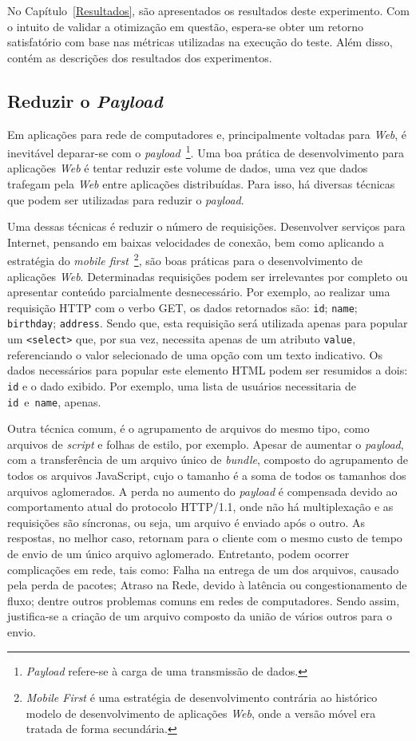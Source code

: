 No Capítulo~\ref{Resultados}, são apresentados os resultados deste experimento. Com o intuito de validar a otimização em questão, espera-se obter um retorno satisfatório com base nas métricas utilizadas na execução do teste. Além disso, contém as descrições dos resultados dos experimentos.
%
%
%
\subsection{Reduzir o \textit{Payload}}
\label{SubPayload}

Em aplicações para rede de computadores e, principalmente voltadas para \textit{Web}, é inevitável deparar-se com o \textit{payload}~\footnote{\textit{Payload} refere-se à carga de uma transmissão de dados.}. Uma boa prática de desenvolvimento para aplicações \textit{Web} é tentar reduzir este volume de dados, uma vez que dados trafegam pela \textit{Web} entre aplicações distribuídas. Para isso, há diversas técnicas que podem ser utilizadas para reduzir o \textit{payload}.

Uma dessas técnicas é reduzir o número de requisições. Desenvolver serviços para Internet, pensando em baixas velocidades de conexão, bem como aplicando a estratégia do \textit{mobile first}~\footnote{\textit{Mobile First} é uma estratégia de desenvolvimento contrária ao histórico modelo de desenvolvimento de aplicações \textit{Web}, onde a versão móvel era tratada de forma secundária.}, são boas práticas para o desenvolvimento de aplicações \textit{Web}. Determinadas requisições podem ser irrelevantes por completo ou apresentar conteúdo parcialmente desnecessário. Por exemplo, ao realizar uma requisição HTTP com o verbo GET, os dados retornados são: \texttt{id}; \texttt{name}; \texttt{birthday}; \texttt{address}. Sendo que, esta requisição será utilizada apenas para popular um \texttt{<select>} que, por sua vez, necessita apenas de um atributo \texttt{value}, referenciando o valor selecionado de uma opção com um texto indicativo. Os dados necessários para popular este elemento HTML podem ser resumidos a dois: \texttt{id} e o dado exibido. Por exemplo, uma lista de usuários necessitaria de \texttt{id}~e~\texttt{name}, apenas.

Outra técnica comum, é o agrupamento de arquivos do mesmo tipo, como arquivos de \textit{script} e folhas de estilo, por exemplo. Apesar de aumentar o \textit{payload}, com a transferência de um arquivo único de \textit{bundle}, composto do agrupamento de todos os arquivos JavaScript, cujo o tamanho é a soma de todos os tamanhos dos arquivos aglomerados. A perda no aumento do \textit{payload} é compensada devido ao comportamento atual do protocolo HTTP/1.1, onde não há multiplexação e as requisições são síncronas, ou seja, um arquivo é enviado após o outro. As respostas, no melhor caso, retornam para o cliente com o mesmo custo de tempo de envio de um único arquivo aglomerado. Entretanto, podem ocorrer complicações em rede, tais como: Falha na entrega de um dos arquivos, causado pela perda de pacotes; Atraso na Rede, devido à latência ou congestionamento de fluxo; dentre outros problemas comuns em redes de computadores. Sendo assim, justifica-se a criação de um arquivo composto da união de vários outros para o envio.

